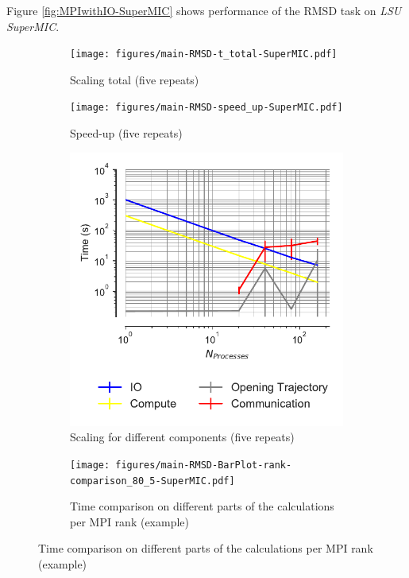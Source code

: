 Figure \ref{fig:MPIwithIO-SuperMIC} shows performance of the RMSD task on \emph{LSU SuperMIC}. 

\begin{figure}[!htb]
  \centering
  \begin{subfigure}{.4\textwidth}
    \texttt{[image: figures/main-RMSD-t\_total-SuperMIC.pdf]}
    \caption{Scaling total (five repeats)}
    \label{fig:MPIscaling-SuperMIC}
  \end{subfigure}
  \hfill
  \begin{subfigure}{.4\textwidth}
    \texttt{[image: figures/main-RMSD-speed\_up-SuperMIC.pdf]}
    \caption{Speed-up (five repeats)}
    \label{fig:MPIspeedup-SuperMIC}
  \end{subfigure}
  \bigskip

  \begin{subfigure}{.4\textwidth}
    \includegraphics[width=\linewidth]{figures/main-RMSD-time_comp_IO_comparison-SuperMIC.pdf}
    \captionsetup{format=hang}
    \caption{Scaling for different components (five repeats)}
    \label{fig:ScalingComputeIO-SuperMIC}
  \end{subfigure}
  \hfill
  \begin{subfigure} {.5\textwidth}
    \texttt{[image: figures/main-RMSD-BarPlot-rank-comparison\_80\_5-SuperMIC.pdf]}
    \captionsetup{format=hang}
    \caption{Time comparison on different parts of the calculations per MPI rank (example)}

\end{subfigure}
\end{figure}
